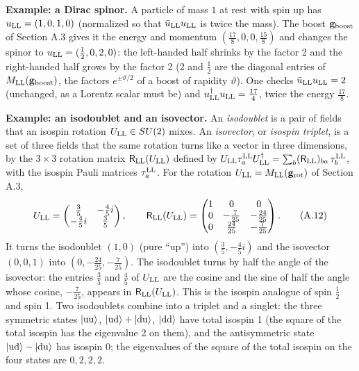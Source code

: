 \documentclass[
  10pt,
]{article}
\begin{document}
\textbf{Example: a Dirac spinor.} A particle of mass \(1\) at rest with
spin up has \(u_{\rm LL}=(1,0,1,0)\) (normalized so that
\(\bar u_{\rm LL}u_{\rm LL}\) is twice the mass). The boost
\(\mathbf g_{\rm boost}\) of Section A.3 gives it the energy and
momentum \((\tfrac{17}{8},0,0,\tfrac{15}{8})\) and changes the spinor to
\(u_{\rm LL}=(\tfrac{1}{2},0,2,0)\): the left-handed half shrinks by the
factor 2 and the right-handed half grows by the factor 2 (2 and
\(\tfrac12\) are the diagonal entries of
\(M_{\rm LL}(\mathbf g_{\rm boost})\), the factors
\(e^{\pm\vartheta/2}\) of a boost of rapidity \(\vartheta\)). One checks
\(\bar u_{\rm LL}u_{\rm LL}=2\) (unchanged, as a Lorentz scalar must be)
and \(u_{\rm LL}^\dagger u_{\rm LL}=\tfrac{17}{4}\), twice the energy
\(\tfrac{17}8\).

\textbf{Example: an isodoublet and an isovector.} An \emph{isodoublet}
is a pair of fields that an isospin rotation \(U_{\rm LL}\in SU(2)\)
mixes. An \emph{isovector}, or \emph{isospin triplet}, is a set of three
fields that the same rotation turns like a vector in three dimensions,
by the \(3\times3\) rotation matrix \(\mathsf R_{\rm LL}(U_{\rm LL})\)
defined by
\(U_{\rm LL}\tau^{\rm LL}_aU_{\rm LL}^\dagger=\sum_b(\mathsf R_{\rm LL})_{ba}\,\tau^{\rm LL}_b\),
with the isospin Pauli matrices \(\tau^{\rm LL}_a\). For the rotation
\(U_{\rm LL}=M_{\rm LL}(\mathbf g_{\rm rot})\) of Section A.3,
\[U_{\rm LL}=\begin{pmatrix}\tfrac{3}{5}&-\tfrac{4}{5}i\\-\tfrac{4}{5}i&\tfrac{3}{5}\end{pmatrix},\qquad\mathsf R_{\rm LL}(U_{\rm LL})=\begin{pmatrix}1&0&0\\0&-\tfrac{7}{25}&-\tfrac{24}{25}\\0&\tfrac{24}{25}&-\tfrac{7}{25}\end{pmatrix}.\tag{A.12}\]
It turns the isodoublet \((1,0)\) (pure ``up'') into
\((\tfrac{3}{5},-\tfrac{4}{5}i)\) and the isovector \((0,0,1)\) into
\((0,-\tfrac{24}{25},-\tfrac{7}{25})\). The isodoublet turns by half the
angle of the isovector: the entries \(\tfrac35\) and \(\tfrac45\) of
\(U_{\rm LL}\) are the cosine and the sine of half the angle whose
cosine, \(-\tfrac7{25}\), appears in \(\mathsf R_{\rm LL}(U_{\rm LL})\).
This is the isospin analogue of spin \(\tfrac12\) and spin 1. Two
isodoublets combine into a triplet and a singlet: the three symmetric
states \(|{\rm uu}\rangle\), \(|{\rm ud}\rangle+|{\rm du}\rangle\),
\(|{\rm dd}\rangle\) have total isospin 1 (the square of the total
isospin has the eigenvalue 2 on them), and the antisymmetric state
\(|{\rm ud}\rangle-|{\rm du}\rangle\) has isospin 0; the eigenvalues of
the square of the total isospin on the four states are \(0, 2, 2, 2\).
\end{document}
